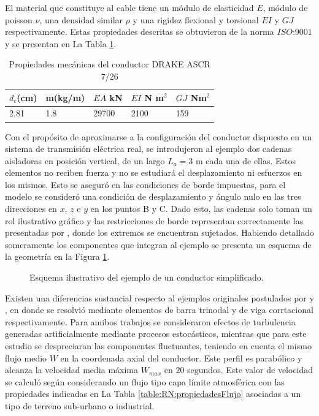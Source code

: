 El material que constituye al cable tiene un módulo de elasticidad $E$, módulo de poisson $\nu$, una densidad similar $\rho$ y una rigidez flexional y torsional $EI$ y $GJ$ respectivamente. Estas propiedades descritas se obtuvieron de la norma $\textit{ISO:9001}$ y se presentan en La Tabla \ref{table:RN:FotiCable:propiedadesCable}.

\begin{table}[ht!]
	\begin{center}
		\begin{tabular}{ | m{2cm} | m{2cm} | m{2cm} | m{2cm} |  m{2cm} | }
			\hline $d_c$(cm) & m(kg/m)& $EA$ kN& $EI$ N m$^2$& $GJ$ Nm$^2$  \\ \hline
			2.81 & 1.8 & 29700 &2100 &159   \\ \hline
		\end{tabular}
	\end{center}
	\caption{Propiedades mecánicas del conductor DRAKE ASCR 7/26 }
	\label{table:RN:FotiCable:propiedadesCable}
\end{table}

Con el propósito de aproximarse a la configuración del conductor dispuesto en un sistema de transmisión eléctrica real, se introdujeron al ejemplo dos cadenas aisladoras en posición vertical, de un largo $L_a=3$ m cada una de ellas. Estos elementos no reciben fuerza y no se estudiará el desplazamiento ni esfuerzos en los mismos. Esto se aseguró en las condiciones de borde impuestas, para el modelo se consideró una condición de desplazamiento y ángulo nulo en las tres direcciones en $x$, $z$ e $y$ en los puntos $\text{B}$ y $\text{C}$. Dado esto, las cadenas solo toman un rol ilustrativo gráfico y las restricciones de borde representan correctamente las presentadas por \textcite{foti2018finite}, donde los extremos se encuentran sujetados. Habiendo detallado someramente los componentes que integran al ejemplo se presenta un esquema de la geometría  en la Figura \ref{fig:RN:FotiCable:Ilustracion}.

\begin{figure}[htbp]
	\centering
	\def\svgwidth{80mm}
	
	\caption{Esquema ilustrativo del ejemplo de un conductor simplificado.}
	\label{fig:RN:FotiCable:Ilustracion}
\end{figure}

 Existen una diferencias sustancial respecto al ejemplos originales postulados por \textcite{luongo1998non} y \textcite{martinelli2001numerical}, en donde se resolvió mediante elementos de barra trinodal y de viga corrtacional respectivamente. Para amibos trabajos se consideraron efectos de turbulencia generadas artificialmente mediante procesos estocásticos, mientras que para este estudio se despreciaran las componentes fluctuantes, teniendo en cuenta el mismo flujo medio $W$  en la coordenada axial del conductor. Este perfil es parabólico y alcanza la velocidad media máxima $W_{max}$ en $20$ segundos. Este valor de velocidad se calculó según \cite{IEC60826} considerando un flujo tipo capa límite atmosférica con las propiedades indicadas en La Tabla \ref{table:RN:propiedadesFlujo} asociadas a un tipo de terreno sub-urbano o industrial.


